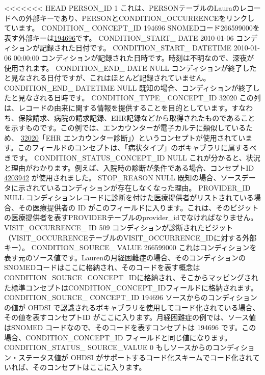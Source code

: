 \documentclass[
  11pt]{book}
\theoremstyle{definition}
\theoremstyle{definition}
\theoremstyle{definition}
\theoremstyle{definition}
\theoremstyle{remark}
\begin{document}
\textless\textless\textless\textless\textless\textless\textless{} HEAD
\textbar{} PERSON\_ID \textbar{} 1 \textbar{} これは、PERSONテーブルのLauraのレコードへの外部キーであり、PERSONとCONDITION\_OCCURRENCEをリンクしています。 \textbar{}
\textbar{} CONDITION\_ CONCEPT\_ID \textbar{} 194696 \textbar{} SNOMEDコード266599000を表す外部キーは\href{http://athena.ohdsi.org/search-terms/terms/194696}{194696}です。 \textbar{}
\textbar{} CONDITION\_START\_ DATE \textbar{} 2010-01-06 \textbar{} コンディションが記録された日付です。 \textbar{}
\textbar{} CONDITION\_START\_ DATETIME \textbar{} 2010-01-06 00:00:00 \textbar{} コンディションが記録された日時です。時刻は不明なので、深夜が使用されます。 \textbar{}
\textbar{} CONDITION\_END\_ DATE \textbar{} NULL \textbar{} コンディションが終了したと見なされる日付ですが、これはほとんど記録されていません。 \textbar{}
\textbar{} CONDITION\_END\_ DATETIME \textbar{} NULL \textbar{} 既知の場合、コンディションが終了したと見なされる日時です。 \textbar{}
\textbar{} CONDITION\_TYPE\_ CONCEPT\_ID \textbar{} 32020 \textbar{} この列は、レコードの由来に関する情報を提供することを目的としています。すなわち、保険請求、病院の請求記録、EHR記録などから取得されたものであることを示すものです。この例では、エンカウンターが電子カルテに類似しているため、 \href{http://athena.ohdsi.org/search-terms/terms/32020}{32020}「EHR エンカウンター診断」）というコンセプトが使用されています。このフィールドのコンセプトは、「病状タイプ」のボキャブラリに属するべきです。 \textbar{}
\textbar{} CONDITION\_STATUS\_CONCEPT\_ID \textbar{} NULL \textbar{}
\textbar{} これが分かると、状況と理由がわかります。例えば、入院時の診断が条件である場合、コンセプトID \href{http://athena.ohdsi.org/search-terms/terms/4203942}{4203942} が使用されました。 \textbar{}
\textbar{} STOP\_REASON \textbar{} NULL \textbar{} 既知の場合、ソースデータに示されているコンディションが存在しなくなった理由。 \textbar{}
\textbar{} PROVIDER\_ID \textbar{} NULL \textbar{} コンディションレコードに診断を付けた医療提供者がリストされている場合、その医療提供者の ID がこのフィールドに入ります。これは、そのビジットの医療提供者を表すPROVIDERテーブルのprovider\_idでなければなりません。 \textbar{}
\textbar{} VISIT\_OCCURRENCE\_ ID \textbar{} 509 \textbar{} コンディションが診断されたビジット（VISIT\_OCCURRENCEテーブルのVISIT\_OCCURRENCE\_IDに対する外部キー）。 \textbar{}
\textbar{} CONDITION\_SOURCE\_ VALUE \textbar{} 266599000 \textbar{} これはコンディションを表す元のソース値です。Laurenの月経困難症の場合、そのコンディションのSNOMEDコードはここに格納され、そのコードを表す概念はCONDITION\_SOURCE\_CONCEPT\_IDに格納され、そこからマッピングされた標準コンセプトはCONDITION\_CONCEPT\_IDフィールドに格納されます。 \textbar{}
\textbar{} CONDITION\_SOURCE\_ CONCEPT\_ID \textbar{} 194696 \textbar{} ソースからのコンディションの値が OHDSI で認識されるボキャブラリを使用してコード化されている場合、その値を表すコンセプトID がここに入ります。月経困難症の例では、ソース値はSNOMED コードなので、そのコードを表すコンセプトは 194696 です。この場合、CONDITION\_CONCEPT\_ID フィールドと同じ値になります。 \textbar{}
\textbar{} CONDITION\_STATUS\_ SOURCE\_VALUE \textbar{} 0 \textbar{} もしソースからのコンディション・ステータス値が OHDSI がサポートするコード化スキームでコード化されていれば、そのコンセプトはここに入ります。 \textbar{}
\end{document}
